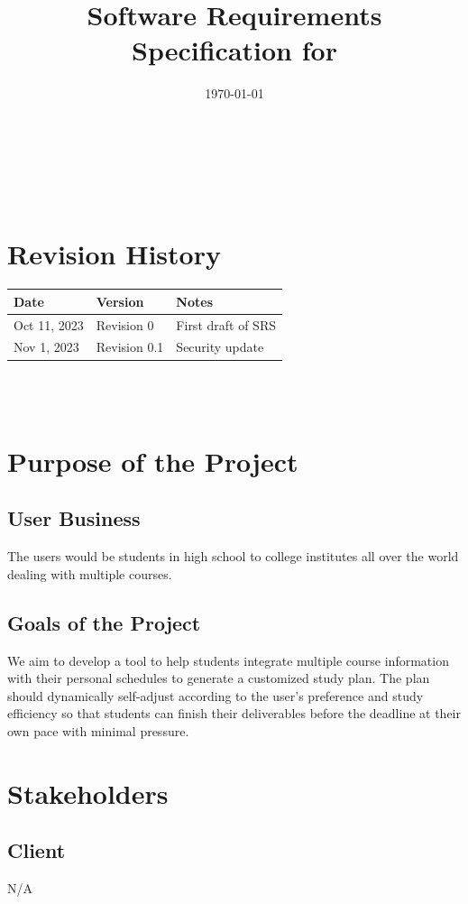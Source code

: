 \documentclass[12pt]{article}
\begin{document}
\title{Software Requirements Specification for \progname} 
\author{\authname}
\date{\today}
	
\maketitle
~\newpage


\tableofcontents

~\newpage

\section*{Revision History}

\begin{tabularx}{\textwidth}{p{3cm}p{2cm}X}
\toprule {\textbf{Date}} & {\textbf{Version}} & {\textbf{Notes}}\\
\midrule
Oct 11, 2023 & Revision 0 & First draft of SRS \\
Nov 1, 2023 & Revision 0.1 & Security update \\
\bottomrule
\end{tabularx}

~\\

~\newpage
\section{Purpose of the Project}
\subsection{User Business}
The users would be students in high school to college institutes all over the world dealing with multiple courses.
\subsection{Goals of the Project}
We aim to develop a tool to help students integrate multiple course information with their personal schedules to generate a customized study plan. The plan should dynamically self-adjust according to the user's preference and study efficiency so that students can finish their deliverables before the deadline at their own pace with minimal pressure.
\section{Stakeholders}
\subsection{Client}
N/A
\end{document}
